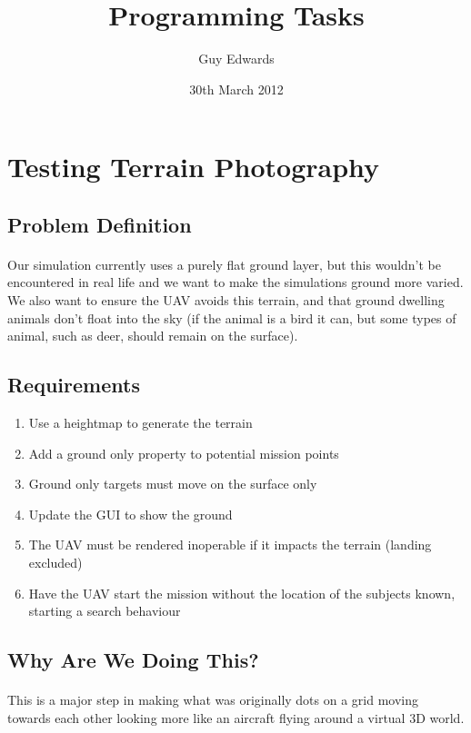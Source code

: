 \documentclass[11pt]{book}
\title{\textbf{Programming Tasks}}
\author{Guy Edwards}
\date{30th March 2012}
\begin{document}
\section{Testing Terrain Photography}

\subsection{Problem Definition}

\paragraph{} Our simulation currently uses a purely flat ground layer, but
this wouldn't be encountered in real life and we want to make the simulations
ground more varied. We also want to ensure the UAV avoids this terrain, and
that ground dwelling animals don't float into the sky (if the animal is a bird
it can, but some types of animal, such as deer, should remain on the surface).

\subsection{Requirements}

\begin{enumerate}
\item Use a heightmap to generate the terrain
\item Add a ground only property to potential mission points
\item Ground only targets must move on the surface only
\item Update the GUI to show the ground
\item The UAV must be rendered inoperable if it impacts the terrain (landing excluded)
\item Have the UAV start the mission without the location of the subjects known, starting a search behaviour
\end{enumerate}

\subsection{Why Are We Doing This?}

\paragraph{} This is a major step in making what was originally dots on a grid
moving towards each other looking more like an aircraft flying around a
virtual 3D world.
\end{document}
